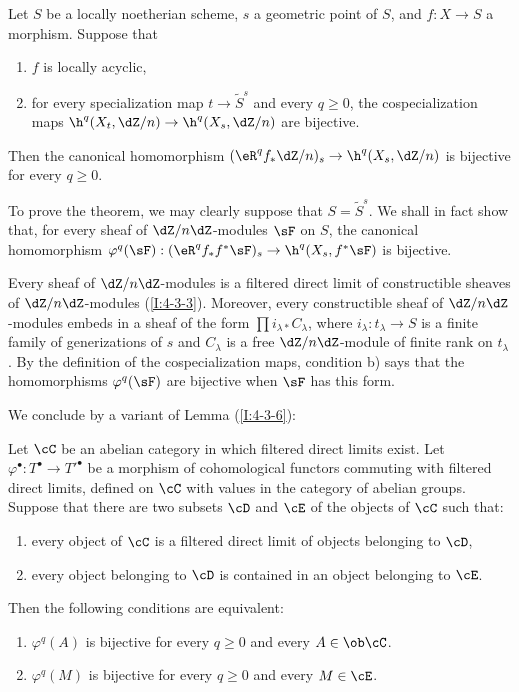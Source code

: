 \documentclass[oneside]{book}
\begin{document}
\begin{theorem}\label{I:5-1-7}
Let $S$ be a locally noetherian scheme, $s$ a geometric point of $S$,
and $f:X\to S$ a morphism. Suppose that
\begin{enumerate}[\indent a)]
  \item $f$ is locally acyclic,
  \item for every specialization map $t\to\widetilde S^s$ and every
    $q\geqslant0$, the cospecialization maps
    $\h^q(X_t,\dZ/n)\to\h^q(X_s,\dZ/n)$ are bijective.
\end{enumerate}
Then the canonical homomorphism
$(\eR^qf_*\dZ/n)_s\to\h^q(X_s,\dZ/n)$ is bijective for every
$q\geqslant0$.
\end{theorem}

To prove the theorem, we may clearly suppose that
$S=\widetilde S^s$. We shall in fact show that, for every sheaf of
$\dZ/n\dZ$-modules $\sF$ on $S$, the canonical homomorphism
$\varphi^q(\sF):(\eR^qf_*f^*\sF)_s\to\h^q(X_s,f^*\sF)$ is bijective.

Every sheaf of $\dZ/n\dZ$-modules is a filtered direct limit of
constructible sheaves of $\dZ/n\dZ$-modules (\ref{I:4-3-3}). Moreover,
every constructible sheaf of $\dZ/n\dZ$-modules embeds in a sheaf of the
form $\prod i_{\lambda *}C_\lambda$, where
$i_\lambda:t_\lambda\to S$ is a finite family of generizations of $s$
and $C_\lambda$ is a free $\dZ/n\dZ$-module of finite rank on
$t_\lambda$. By the definition of the cospecialization maps, condition
b) says that the homomorphisms $\varphi^q(\sF)$ are bijective when
$\sF$ has this form.

We conclude by a variant of Lemma (\ref{I:4-3-6}):

\begin{lemma}\label{I:5-1-8}
Let $\cC$ be an abelian category in which filtered direct limits exist.
Let $\varphi^\bullet:T^\bullet\to{T'}^\bullet$ be a morphism of
cohomological functors commuting with filtered direct limits, defined on
$\cC$ with values in the category of abelian groups. Suppose that there
are two subsets $\cD$ and $\cE$ of the objects of $\cC$ such that:
\begin{enumerate}[\indent a)]
  \item every object of $\cC$ is a filtered direct limit of objects
    belonging to $\cD$,
  \item every object belonging to $\cD$ is contained in an object
    belonging to $\cE$.
\end{enumerate}
Then the following conditions are equivalent:
\begin{enumerate}[\indent (i)]
  \item $\varphi^q(A)$ is bijective for every $q\geqslant0$ and every
    $A\in\ob\cC$.
  \item $\varphi^q(M)$ is bijective for every $q\geqslant0$ and every
    $M\in\cE$.
\end{enumerate}
\end{lemma}
\end{document}
